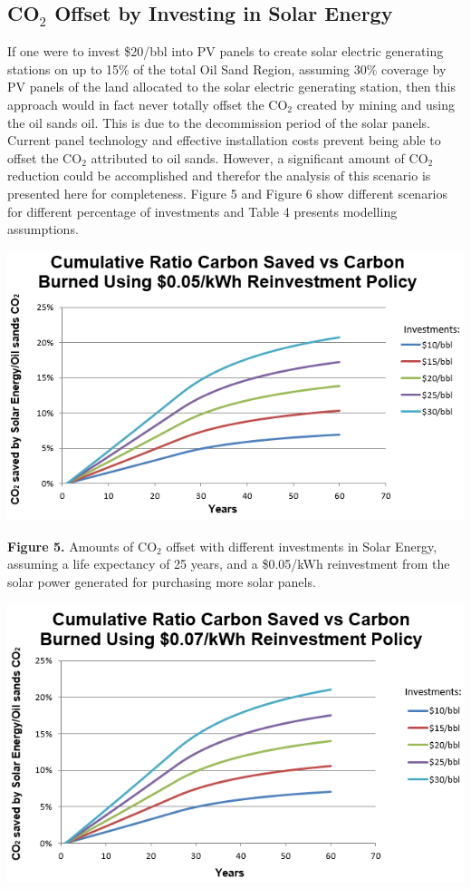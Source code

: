 \documentclass[12pt]{article}
\begin{document}
\subsection{CO$_2$ Offset by Investing in Solar Energy}

If one were to invest \$20/bbl into PV panels to create solar electric generating stations on up to 15\% of the total Oil Sand Region, assuming 30\% coverage by PV panels of the land allocated to the solar electric generating station, then this approach would in fact never totally offset the CO$_2$ created by mining and using the oil sands oil. This is due to the decommission period of the solar panels. Current panel technology and effective installation costs prevent being able to offset the CO$_2$ attributed to oil sands. However, a significant amount of CO$_2$ reduction could be accomplished and therefor the analysis of this scenario is presented here for completeness.  Figure 5 and Figure 6 show different scenarios for different percentage of investments and Table 4 presents modelling assumptions.

\begin{center}
\includegraphics{g5.png}
\end{center}

\begin{center}
{\bf Figure 5.} Amounts of CO$_2$ offset with different investments in Solar Energy, assuming a life expectancy of 25 years, and a \$0.05/kWh reinvestment from the solar power generated for purchasing more solar panels.  
\end{center}

\begin{center}
\includegraphics{g6.png}
\end{center}
\end{document}

